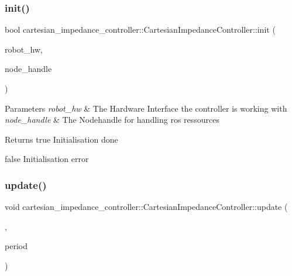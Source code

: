 \subsubsection{\texorpdfstring{init()}{init()}}
{\footnotesize\ttfamily bool cartesian\+\_\+impedance\+\_\+controller\+::\+Cartesian\+Impedance\+Controller\+::init (\begin{DoxyParamCaption}\item[{hardware\+\_\+interface\+::\+Robot\+HW $\ast$}]{robot\+\_\+hw,  }\item[{ros\+::\+Node\+Handle \&}]{node\+\_\+handle }\end{DoxyParamCaption})\hspace{0.3cm}{\ttfamily [override]}}


\begin{DoxyParams}{Parameters}
{\em robot\+\_\+hw} & The Hardware Interface the controller is working with \\
\hline
{\em node\+\_\+handle} & The Nodehandle for handling ros ressources \\
\hline
\end{DoxyParams}
\begin{DoxyReturn}{Returns}
true Initialisation done 

false Initialisation error 
\end{DoxyReturn}
\mbox{\label{classcartesian__impedance__controller_1_1CartesianImpedanceController_a162ec78cc09242e43edc695eab7c0a3f}} 
\subsubsection{\texorpdfstring{update()}{update()}}
{\footnotesize\ttfamily void cartesian\+\_\+impedance\+\_\+controller\+::\+Cartesian\+Impedance\+Controller\+::update (\begin{DoxyParamCaption}\item[{const ros\+::\+Time \&}]{,  }\item[{const ros\+::\+Duration \&}]{period }\end{DoxyParamCaption})\hspace{0.3cm}{\ttfamily [override]}}


